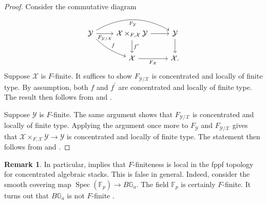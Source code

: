 \documentclass[11pt]{amsart}
\theoremstyle{plain}
\theoremstyle{definition}
\newtheorem{remark}[theorem]{Remark}
\numberwithin{equation}{section}
\numberwithin{theorem}{section}
\begin{document}
\begin{proof}
    Consider the commutative diagram
    \begin{displaymath}
        \begin{tikzcd}
            {\mathcal{Y}} & {\mathcal{X}\times_{F,\mathcal{X}} \mathcal{Y}} & {\mathcal{Y}} \\
            & {\mathcal{X}} & {\mathcal{X}.}
            \arrow["{F_{\mathcal{Y}/\mathcal{X}}}"', from=1-1, to=1-2]
            \arrow["F_{\mathcal{Y}}"', bend right =-30pt, from=1-1, to=1-3]
            \arrow["f",bend right =12pt, from=1-1, to=2-2]
            \arrow[from=1-2, to=1-3]
            \arrow["f^\prime",from=1-2, to=2-2]
            \arrow[from=1-3, to=2-3]
            \arrow["F_{\mathcal{X}}"', from=2-2, to=2-3]
        \end{tikzcd}
    \end{displaymath}
    Suppose $\mathcal{X}$ is $F$-finite. 
    It suffices to show $F_{\mathcal{Y}/\mathcal{X}}$ is concentrated and locally of finite type. 
    By assumption, both $f$ and $f^\prime$ are concentrated and locally of finite type. 
    The result then follows from \cite[Lemma 2.5(4)]{Hall/Rydh:2017} and \cite[\href{https://stacks.math.columbia.edu/tag/06U9}{Tag 06U9}]{stacks-project}. 

    Suppose $\mathcal{Y}$ is $F$-finite. 
    The same argument shows that $F_{\mathcal{Y}/\mathcal{X}}$ is concentrated and locally of finite type. 
    Applying the argument once more to $F_\mathcal{Y}$ and $F_{\mathcal{Y}/\mathcal{X}}$ gives that $\mathcal{X}\times_{F,\mathcal{X}} \mathcal{Y}\to\mathcal{Y}$ is concentrated and locally of finite type. 
    The statement then follows from \cite[Lemma 2.5(2)]{Hall/Rydh:2017} and \cite[\href{https://stacks.math.columbia.edu/tag/06U7}{Tag 06U7}]{stacks-project}.
\end{proof}

\begin{remark}
    In particular,  implies that $F$-finiteness is local in the fppf topology for concentrated algebraic stacks. This is false in general. Indeed, consider the smooth covering map $\operatorname{Spec}(\mathbb{F}_p)\to B\mathbb{G}_a$. The field $\mathbb{F}_p$ is certainly $F$-finite. It turns out that $B\mathbb{G}_a$ is not $F$-finite .
\end{remark}
\end{document}
